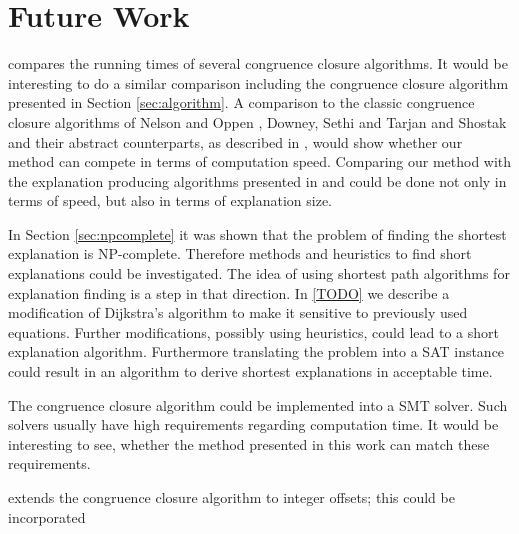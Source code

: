 \section*{Future Work}

\cite{Bachmair2000} compares the running times of several congruence closure algorithms.
It would be interesting to do a similar comparison including the congruence closure algorithm presented in Section \ref{sec:algorithm}.
A comparison to the classic congruence closure algorithms of Nelson and Oppen \cite{Nelson1980}, Downey, Sethi and Tarjan \cite{Downey1980} and Shostak \cite{Shostak1978} and their abstract counterparts, as described in \cite{Bachmair2000}, would show whether our method can compete in terms of computation speed.
Comparing our method with the explanation producing algorithms presented in \cite{Fontaine2004} and \cite{Nieuwenhuis2005,Nieuwenhuis2007} could be done not only in terms of speed, but also in terms of explanation size.

In Section \ref{sec:npcomplete} it was shown that the problem of finding the shortest explanation is NP-complete.
Therefore methods and heuristics to find short explanations could be investigated.
The idea of using shortest path algorithms for explanation finding is a step in that direction.
In \ref{TODO} we describe a modification of Dijkstra's algorithm \cite{TODO} to make it sensitive to previously used equations.
Further modifications, possibly using heuristics, could lead to a short explanation algorithm.
Furthermore translating the problem into a SAT instance could result in an algorithm to derive shortest explanations in acceptable time.

The congruence closure algorithm could be implemented into a SMT solver.
Such solvers usually have high requirements regarding computation time.
It would be interesting to see, whether the method presented in this work can match these requirements.

{\color{blue} \cite{Nieuwenhuis2007} extends the congruence closure algorithm to integer offsets; this could be incorporated}